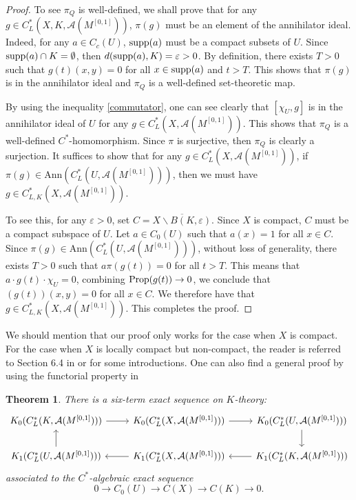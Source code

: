\documentclass[11pt]{article}
\theoremstyle{definition}
\theoremstyle{plain}
\newtheorem{Thm}[Def]{Theorem}
\def\A{\mathcal A}\def\C{\mathcal C}\def\B{\mathcal B}\def\E{\mathcal E}\def\O{\mathcal O}\def\h{\mathfrak h}\def\K{\mathcal K}\def\F{\mathcal F}\def\P{\mathcal P}\def\L{\mathcal L}\def\R{\mathcal R}\def\Q{\mathcal Q}\def\H{\mathcal H}\def\S{\mathcal S}\def\N{\mathcal N}\def\U{\mathcal U}\def\V{\mathcal V}
\def\supp{\textup{supp}}
\def\prop{\textup{Prop}}
\begin{document}
\begin{appendices}
\begin{proof}
To see $\pi_Q$ is well-defined, we shall prove that for any $g\in C^*_{L}(X,K,\A(M^{[0,1]}))$, $\pi(g)$ must be an element of the annihilator ideal. Indeed, for any $a\in C_c(U)$, $\supp(a)$ must be a compact subsets of $U$. Since $\supp(a)\cap K=\emptyset$, then $d(\supp(a),K)=\varepsilon>0$. By definition, there exists $T>0$ such that $g(t)(x,y)=0$ for all $x\in\supp(a)$ and $t>T$. This shows that $\pi(g)$ is in the annihilator ideal and $\pi_Q$ is a well-defined set-theoretic map.

By using the inequality \eqref{commutator}, one can see clearly that $[\chi_U,g]$ is in the annihilator ideal of $U$ for any $g\in C^*_L(X,\A(M^{[0,1]}))$. This shows that $\pi_Q$ is a well-defined $C^*$-homomorphism. Since $\pi$ is surjective, then $\pi_Q$ is clearly a surjection. It suffices to show that for any $g\in C^*_L(X,\A(M^{[0,1]}))$, if $\pi(g)\in \mathrm{Ann}(C^*_L(U,\A(M^{[0,1]})))$, then we must have $g\in C^*_{L,K}(X,\A(M^{[0,1]}))$.

To see this, for any $\varepsilon>0$, set $C=\overline{X\backslash B(K,\varepsilon)}$. Since $X$ is compact, $C$ must be a compact subspace of $U$. Let $a\in C_0(U)$ such that $a(x)=1$ for all $x\in C$. Since $\pi(g)\in \mathrm{Ann}(C^*_L(U,\A(M^{[0,1]})))$, without loss of generality, there exists $T>0$ such that $a\pi(g(t))=0$ for all $t>T$. This means that $a\cdot g(t)\cdot\chi_U=0$, combining $\prop(g(t))\to 0$, we conclude that $(g(t))(x,y)=0$ for all $x\in C$. We therefore have that $g\in C^*_{L,K}(X,\A(M^{[0,1]}))$. This completes the proof.
\end{proof}

We should mention that our proof only works for the case when $X$ is compact. For the case when $X$ is locally compact but non-compact, the reader is referred to Section 6.4 in \cite{HIT2020} or \cite[Proposition 4.6]{GLWZ2022} for some introductions. One can also find a general proof by using the functorial property in \cite[Proposition B.2.3]{HIT2020}


\begin{Thm}\label{excision}
There is a six-term exact sequence on $K$-theory:
$$\begin{tikzcd}
K_0(C^*_L(K,\A(M^{[0,1]}))) \arrow[r] & K_0(C^*_L(X,\A(M^{[0,1]}))) \arrow[r] & K_0(C^*_L(U,\A(M^{[0,1]}))) \arrow[d] \\
K_1(C^*_L(U,\A(M^{[0,1]}))) \arrow[u] & K_1(C^*_L(X,\A(M^{[0,1]}))) \arrow[l] & K_1(C^*_L(K,\A(M^{[0,1]}))) \arrow[l]
\end{tikzcd}$$
associated to the $C^*$-algebraic exact sequence
$$0\to C_0(U)\to C(X)\to C(K)\to 0.$$
\end{Thm}


\end{appendices}
\end{document}

